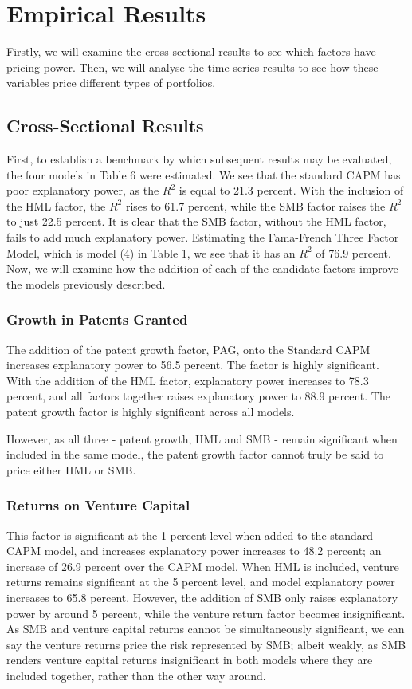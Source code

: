 \documentclass[12pt]{article}
\begin{document}
\section{Empirical Results}

Firstly, we will examine the cross-sectional results to see which factors have pricing power.  Then, we will analyse the time-series results to see how these variables price different types of portfolios.

	\subsection{Cross-Sectional Results}

First, to establish a benchmark by which subsequent results may be evaluated, the four models in Table 6 were estimated. We see that the standard CAPM has poor explanatory power, as the $R^2$ is equal to 21.3 percent. With the inclusion of the HML factor, the $R^2$ rises to 61.7 percent, while the SMB factor raises the $R^2$ to just 22.5 percent. It is clear that the SMB factor, without the HML factor, fails to add much explanatory power. Estimating the Fama-French Three Factor Model, which is model (4) in Table 1, we see that it has an $R^2$ of 76.9 percent. Now, we will examine how the addition of each of the candidate factors improve the models previously described.

	\subsubsection{Growth in Patents Granted}
		The addition of the patent growth factor, PAG, onto the Standard CAPM increases explanatory power to 56.5 percent. The factor is highly significant. With the addition of the HML factor, explanatory power increases to 78.3 percent, and all factors together raises explanatory power to 88.9 percent.  The patent growth factor is highly significant across all models.

		However, as all three - patent growth, HML and SMB - remain significant when included in the same model, the patent growth factor cannot truly be said to price either HML or SMB.

	\subsubsection{Returns on Venture Capital}

	 This factor is significant at the 1 percent level when added to the standard CAPM model, and increases explanatory power increases to 48.2 percent; an increase of 26.9 percent over the CAPM model. When HML is included, venture returns remains significant at the 5 percent level, and model explanatory power increases to 65.8 percent. However, the addition of SMB only raises explanatory power by around 5 percent, while the venture return factor becomes insignificant. As SMB and venture capital returns cannot be simultaneously significant, we can say the venture returns price the risk represented by SMB; albeit weakly, as SMB renders venture capital returns insignificant in both models where they are included together, rather than the other way around.
\end{document}
